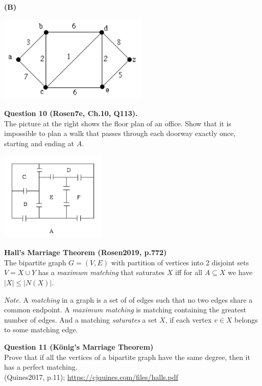 \documentclass[jou]{apa6}
\begin{document}
\newpage
{\bf (B)}
\begin{center}
\includegraphics[width=2.8in]{dijkstra-graph2.png}
\end{center}



\vspace{10pt}
{\bf Question 10 (Rosen7e, Ch.10, Q113).}\\
The picture at the right shows the floor plan of
an office. Show that it is impossible to plan a walk that passes through
each doorway exactly once, starting and ending at $A$.
\begin{center}
\includegraphics[width=2in]{floor-plan-graph.png}
\end{center}



\vspace{10pt}
{\bf Hall's Marriage Theorem (Rosen2019, p.772)}\\
The bipartite graph $G=(V,E)$ with partition 
of vertices into 2 disjoint sets $V = X \cup Y$ 
has a {\em maximum matching} that saturates $X$
iff for all $A \subseteq X$ we have
$|X| \leq |N(X)|$. 

{\em Note.} A {\em matching} in a graph is a set of of edges
such that no two edges share a common endpoint. 
A {\em maximum matching} is matching containing the greatest
number of edges. And a matching {\em saturates} a set $X$, 
if each vertex $v \in X$ belongs to some matching edge.

\vspace{10pt}
{\bf Question 11 (K\"{o}nig’s Marriage Theorem)}\\
Prove that if all the vertices of a bipartite graph
have the same degree, then it has a perfect matching.\\
(Quines2017, p.11); \url{https://cjquines.com/files/halls.pdf}
\end{document}
